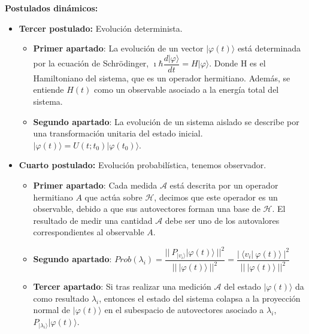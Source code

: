 \textbf{Postulados dinámicos:}
\begin{itemize}
    \item \textbf{Tercer postulado:}\label{Postulado3} Evolución determinista.
        \begin{itemize}
            \item \textbf{Primer apartado}:\label{Postulado3.1} La evolución de un vector $| \varphi (t) \rangle$ está determinada por la ecuación de Schrödinger, $\imath \hbar \dfrac{d|\varphi\rangle}{dt}=H |\varphi\rangle$. Donde H es el Hamiltoniano del sistema, que es un operador hermitiano. Además, se entiende $H(t)$ como un observable asociado a la energía total del sistema.
            \item \textbf{Segundo apartado}:\label{Postulado3.2} La evolución de un sistema aislado se describe por una transformación unitaria del estado inicial. $| \varphi (t) \rangle = U(t;t_{0})  | \varphi (t_{0}) \rangle$.
        \end{itemize}
    
    \vspace{5pt}
    \newpage
    \item \textbf{Cuarto postulado:}\label{Postulado4} Evolución probabilística, tenemos observador.
    \begin{itemize}
        \item \textbf{Primer apartado}:\label{Postulado4.1} Cada medida $\mathscr{A}$ está descrita por un operador hermitiano $A$ que actúa sobre $\mathscr{H}$, decimos que este operador es un observable, debido a que sus autovectores forman una base de $\mathscr{H}$. El resultado de medir una cantidad $\mathscr{A}$ debe ser uno de los autovalores correspondientes al observable $A$.
        \vspace{5pt}
        \item \textbf{Segundo apartado}:\label{Postulado4.2} $Prob(\lambda_{i}) =  \dfrac{||\:P_{|v_{i}\rangle} | \varphi (t) \rangle\:||^{2}}{||\:| \varphi (t) \rangle\:||^{2}} = \dfrac{|\: \langle  v_{i}  |\: \varphi (t)  \rangle\:|^{2}}{||\:| \varphi (t) \rangle\:||^{2}}$
        \vspace{5pt}
        \item \textbf{Tercer apartado}:\label{Postulado4.3} Si tras realizar una medición $\mathscr{A}$ del estado $|\varphi(t) \rangle$ da como resultado $\lambda_{i}$, entonces el estado del sistema colapsa a la proyección normal de $|\varphi(t) \rangle$ en el subespacio de autovectores asociado a $\lambda_{i}$,  $P_{|\lambda_{i} \rangle} | \varphi (t) \rangle$.
    \end{itemize}
\end{itemize}

